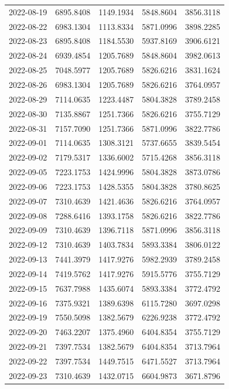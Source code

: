 \begin{footnotesize}
\begin{longtable}{lllll}
2022-08-19 & 6895.8408 & 1149.1934 & 5848.8604 & 3856.3118 \\
2022-08-22 & 6983.1304 & 1113.8334 & 5871.0996 & 3898.2285 \\
2022-08-23 & 6895.8408 & 1184.5530 & 5937.8169 & 3906.6121 \\
2022-08-24 & 6939.4854 & 1205.7689 & 5848.8604 & 3982.0613 \\
2022-08-25 & 7048.5977 & 1205.7689 & 5826.6216 & 3831.1624 \\
2022-08-26 & 6983.1304 & 1205.7689 & 5826.6216 & 3764.0957 \\
2022-08-29 & 7114.0635 & 1223.4487 & 5804.3828 & 3789.2458 \\
2022-08-30 & 7135.8867 & 1251.7366 & 5826.6216 & 3755.7129 \\
2022-08-31 & 7157.7090 & 1251.7366 & 5871.0996 & 3822.7786 \\
2022-09-01 & 7114.0635 & 1308.3121 & 5737.6655 & 3839.5454 \\
2022-09-02 & 7179.5317 & 1336.6002 & 5715.4268 & 3856.3118 \\
2022-09-05 & 7223.1753 & 1424.9996 & 5804.3828 & 3873.0786 \\
2022-09-06 & 7223.1753 & 1428.5355 & 5804.3828 & 3780.8625 \\
2022-09-07 & 7310.4639 & 1421.4636 & 5826.6216 & 3764.0957 \\
2022-09-08 & 7288.6416 & 1393.1758 & 5826.6216 & 3822.7786 \\
2022-09-09 & 7310.4639 & 1396.7118 & 5871.0996 & 3856.3118 \\
2022-09-12 & 7310.4639 & 1403.7834 & 5893.3384 & 3806.0122 \\
2022-09-13 & 7441.3979 & 1417.9276 & 5982.2939 & 3789.2458 \\
2022-09-14 & 7419.5762 & 1417.9276 & 5915.5776 & 3755.7129 \\
2022-09-15 & 7637.7988 & 1435.6074 & 5893.3384 & 3772.4792 \\
2022-09-16 & 7375.9321 & 1389.6398 & 6115.7280 & 3697.0298 \\
2022-09-19 & 7550.5098 & 1382.5679 & 6226.9238 & 3772.4792 \\
2022-09-20 & 7463.2207 & 1375.4960 & 6404.8354 & 3755.7129 \\
2022-09-21 & 7397.7534 & 1382.5679 & 6404.8354 & 3713.7964 \\
2022-09-22 & 7397.7534 & 1449.7515 & 6471.5527 & 3713.7964 \\
2022-09-23 & 7310.4639 & 1432.0715 & 6604.9873 & 3671.8796 \\

\end{longtable}
\end{footnotesize}
